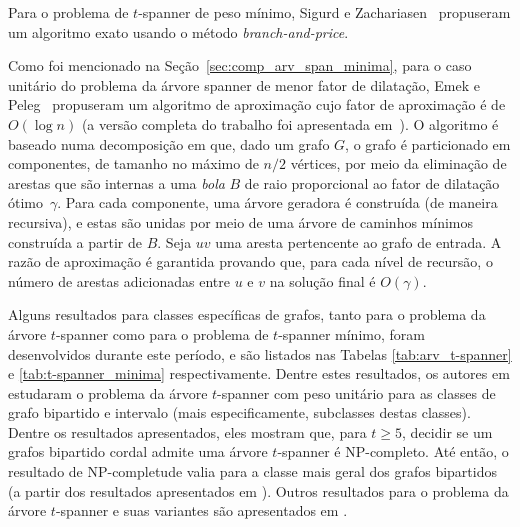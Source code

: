 Para o problema de $t$-spanner de peso mínimo, Sigurd e Zachariasen~\cite{SigurdZ2004} propuseram um algoritmo exato usando o método \emph{branch-and-price}.


Como foi mencionado na Seção~\ref{sec:comp_arv_span_minima},
para o caso unitário do problema da árvore spanner de menor fator de dilatação, 
Emek e Peleg~\cite{EmekP2004} propuseram um algoritmo de aproximação cujo fator de 
aproximação é de $O(\log n)$ (a versão completa do trabalho foi apresentada 
em~\cite{EmekP2008}). O algoritmo é baseado numa decomposição em que, dado 
um grafo $G$, o grafo é particionado em componentes, de tamanho no máximo 
de $n/2$ vértices, por meio da eliminação de arestas que são internas a uma 
\emph{bola} $B$ de raio proporcional ao fator de dilatação ótimo~$\gamma$. 
Para cada componente, uma árvore geradora é construída (de maneira recursiva), 
e estas são unidas por meio de uma árvore de caminhos mínimos construída 
a partir de $B$. Seja $uv$ uma aresta pertencente ao grafo de entrada. A razão 
de aproximação é garantida provando que, para cada nível de recursão, o número 
de arestas adicionadas entre $u$ e $v$ na solução final é $O(\gamma)$.

Alguns resultados para classes específicas de grafos, tanto para o problema da 
árvore $t$-spanner como para o problema de $t$-spanner mínimo, foram 
desenvolvidos durante este período, e são listados nas Tabelas 
\ref{tab:arv_t-spanner} e \ref{tab:t-spanner_minima} respectivamente. 
Dentre estes resultados, os autores em \cite{BrandstadtDLLU2007} estudaram 
o problema da árvore $t$-spanner com peso unitário para as classes de grafo 
bipartido e intervalo (mais especificamente, subclasses destas classes). 
Dentre os resultados apresentados, eles mostram que, para $t \ge 5$, 
decidir se um grafos bipartido cordal admite uma árvore $t$-spanner é 
NP-completo. Até então, o resultado de NP-completude valia para a classe mais 
geral dos grafos bipartidos (a partir dos resultados apresentados em 
\cite{CaiC1995}). Outros resultados para o problema da árvore $t$-spanner e 
suas variantes são apresentados em \cite{LiebchenW2008}.

